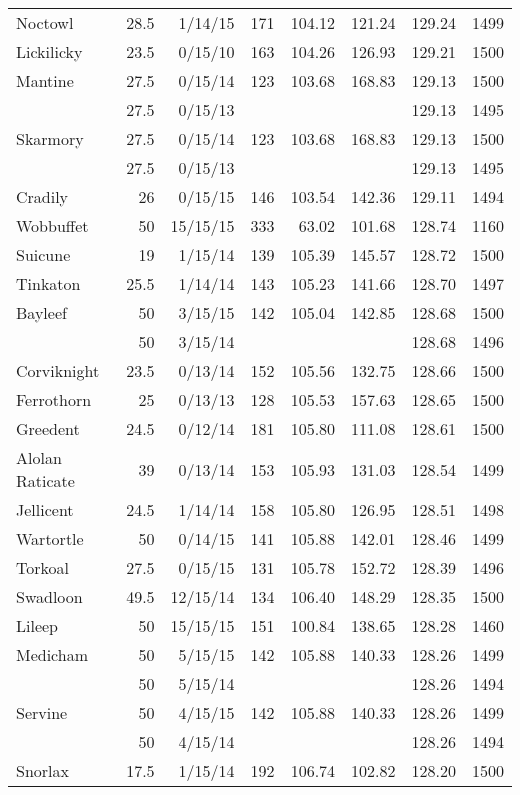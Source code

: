 \begin{longtable}{lrrrrrrr}
Noctowl & 28.5 & 1/14/15 & 171 & 104.12 & 121.24 & 129.24 & 1499\\
Lickilicky & 23.5 & 0/15/10 & 163 & 104.26 & 126.93 & 129.21 & 1500\\
Mantine & 27.5 & 0/15/14 & 123 & 103.68 & 168.83 & 129.13 & 1500\\
 & 27.5 & 0/15/13 & & & & 129.13 & 1495\\
Skarmory & 27.5 & 0/15/14 & 123 & 103.68 & 168.83 & 129.13 & 1500\\
 & 27.5 & 0/15/13 & & & & 129.13 & 1495\\
Cradily & 26 & 0/15/15 & 146 & 103.54 & 142.36 & 129.11 & 1494\\
Wobbuffet & 50 & 15/15/15 & 333 & 63.02 & 101.68 & 128.74 & 1160\\
Suicune & 19 & 1/15/14 & 139 & 105.39 & 145.57 & 128.72 & 1500\\
Tinkaton & 25.5 & 1/14/14 & 143 & 105.23 & 141.66 & 128.70 & 1497\\
Bayleef & 50 & 3/15/15 & 142 & 105.04 & 142.85 & 128.68 & 1500\\
 & 50 & 3/15/14 & & & & 128.68 & 1496\\
Corviknight & 23.5 & 0/13/14 & 152 & 105.56 & 132.75 & 128.66 & 1500\\
Ferrothorn & 25 & 0/13/13 & 128 & 105.53 & 157.63 & 128.65 & 1500\\
Greedent & 24.5 & 0/12/14 & 181 & 105.80 & 111.08 & 128.61 & 1500\\
Alolan Raticate & 39 & 0/13/14 & 153 & 105.93 & 131.03 & 128.54 & 1499\\
Jellicent & 24.5 & 1/14/14 & 158 & 105.80 & 126.95 & 128.51 & 1498\\
Wartortle & 50 & 0/14/15 & 141 & 105.88 & 142.01 & 128.46 & 1499\\
Torkoal & 27.5 & 0/15/15 & 131 & 105.78 & 152.72 & 128.39 & 1496\\
Swadloon & 49.5 & 12/15/14 & 134 & 106.40 & 148.29 & 128.35 & 1500\\
Lileep & 50 & 15/15/15 & 151 & 100.84 & 138.65 & 128.28 & 1460\\
Medicham & 50 & 5/15/15 & 142 & 105.88 & 140.33 & 128.26 & 1499\\
 & 50 & 5/15/14 & & & & 128.26 & 1494\\
Servine & 50 & 4/15/15 & 142 & 105.88 & 140.33 & 128.26 & 1499\\
 & 50 & 4/15/14 & & & & 128.26 & 1494\\
Snorlax & 17.5 & 1/15/14 & 192 & 106.74 & 102.82 & 128.20 & 1500\\

\end{longtable}
